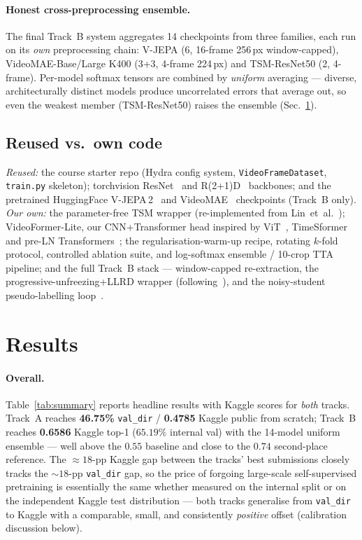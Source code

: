 \documentclass[10pt,twocolumn,letterpaper]{article}
\begin{document}
\paragraph{Honest cross-preprocessing ensemble.}
The final Track~B system aggregates 14 checkpoints from three families, each
run on its \emph{own} preprocessing chain: V-JEPA (6, 16-frame 256\,px
window-capped), VideoMAE-Base/Large K400 (3+3, 4-frame 224\,px) and
TSM-ResNet50 (2, 4-frame). Per-model softmax tensors are combined by
\emph{uniform} averaging --- diverse, architecturally distinct models produce
uncorrelated errors that average out, so even the weakest member
(TSM-ResNet50) raises the ensemble (Sec.~\ref{sec:results}).

\subsection{Reused vs.\ own code}
\label{sec:reuse}
\emph{Reused:} the course starter repo (Hydra config system,
\texttt{VideoFrameDataset}, \texttt{train.py} skeleton); torchvision
ResNet~\cite{he2016resnet} and R(2+1)D~\cite{tran2018r2plus1d} backbones; and
the pretrained HuggingFace V-JEPA\,2~\cite{bardes2025vjepa2} and
VideoMAE~\cite{tong2022videomae} checkpoints (Track~B only).
\emph{Our own:} the parameter-free TSM wrapper (re-implemented from
Lin~et~al.~\cite{lin2019tsm}); VideoFormer-Lite, our CNN+Transformer head
inspired by ViT~\cite{dosovitskiy2021vit}, TimeSformer~\cite{bertasius2021timesformer}
and pre-LN Transformers~\cite{xiong2020prenorm}; the regularisation-warm-up
recipe, rotating $k$-fold protocol, controlled ablation suite, and
log-softmax ensemble / 10-crop TTA pipeline; and the full Track~B stack ---
window-capped re-extraction, the progressive-unfreezing+LLRD wrapper
(following~\cite{howard2018ulmfit,clark2020electra,bao2022beit}), and the
noisy-student pseudo-labelling loop~\cite{xie2020noisystudent,lee2013pseudo}.

\section{Results}
\label{sec:results}

\paragraph{Overall.}
Table~\ref{tab:summary} reports headline results with Kaggle scores for
\emph{both} tracks. Track~A reaches \textbf{46.75\%} \texttt{val\_dir} /
\textbf{0.4785} Kaggle public from scratch; Track~B reaches \textbf{0.6586}
Kaggle top-1 ($65.19\%$ internal val) with the 14-model uniform ensemble ---
well above the $0.55$ baseline and close to the $0.74$ second-place
reference. The ${\approx}18$-pp Kaggle gap between the tracks' best
submissions closely tracks the ${\sim}18$-pp \texttt{val\_dir} gap, so the
price of forgoing large-scale self-supervised pretraining is essentially the
same whether measured on the internal split or on the independent Kaggle test
distribution --- both tracks generalise from \texttt{val\_dir} to Kaggle with
a comparable, small, and consistently \emph{positive} offset (calibration
discussion below).
\end{document}
